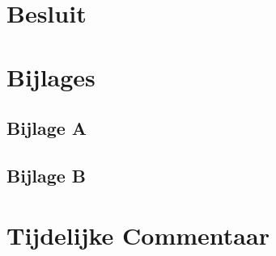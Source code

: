 \documentclass[12pt]{report}
\begin{document}
\chapter*{Besluit}







\chapter*{Bijlages}
\section{Bijlage A}
\label{sec:bijlageA}

\section{Bijlage B}




\chapter{Tijdelijke Commentaar}
\end{document}
